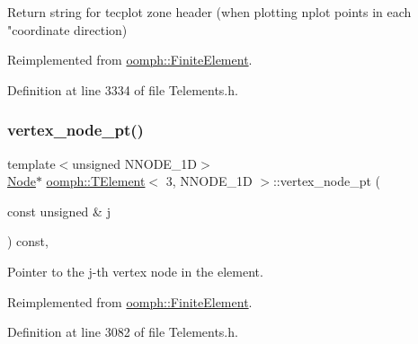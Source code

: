 Return string for tecplot zone header (when plotting nplot points in each "coordinate direction) 



Reimplemented from \hyperlink{classoomph_1_1FiniteElement_a3193df31f9ce38e0609d17a8ffb386c6}{oomph\+::\+Finite\+Element}.



Definition at line 3334 of file Telements.\+h.

\mbox{\label{classoomph_1_1TElement_3_013_00_01NNODE__1D_01_4_a790d5689d21337506b780e2f6bd26296}} 
\subsubsection{\texorpdfstring{vertex\+\_\+node\+\_\+pt()}{vertex\_node\_pt()}}
{\footnotesize\ttfamily template$<$unsigned N\+N\+O\+D\+E\+\_\+1D$>$ \\
\hyperlink{classoomph_1_1Node}{Node}$\ast$ \hyperlink{classoomph_1_1TElement}{oomph\+::\+T\+Element}$<$ 3, N\+N\+O\+D\+E\+\_\+1D $>$\+::vertex\+\_\+node\+\_\+pt (\begin{DoxyParamCaption}\item[{const unsigned \&}]{j }\end{DoxyParamCaption}) const\hspace{0.3cm}{\ttfamily [inline]}, {\ttfamily [virtual]}}



Pointer to the j-\/th vertex node in the element. 



Reimplemented from \hyperlink{classoomph_1_1FiniteElement_a863c4382c879a77ad5607c6f9781c761}{oomph\+::\+Finite\+Element}.



Definition at line 3082 of file Telements.\+h.

\mbox{\label{classoomph_1_1TElement_3_013_00_01NNODE__1D_01_4_ac520bc1079c1ad3433d76ba0978ea6af}} 
